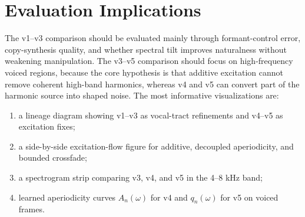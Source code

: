 \documentclass[11pt]{article}
\newcommand{\ap}{A}
\begin{document}
\section{Evaluation Implications}

The v1--v3 comparison should be evaluated mainly through formant-control error,
copy-synthesis quality, and whether spectral tilt improves naturalness without
weakening manipulation. The v3--v5 comparison should focus on high-frequency
voiced regions, because the core hypothesis is that additive excitation cannot
remove coherent high-band harmonics, whereas v4 and v5 can convert part of the
harmonic source into shaped noise. The most informative visualizations are:
\begin{enumerate}
  \item a lineage diagram showing v1--v3 as vocal-tract refinements and v4--v5
        as excitation fixes;
  \item a side-by-side excitation-flow figure for additive, decoupled
        aperiodicity, and bounded crossfade;
  \item a spectrogram strip comparing v3, v4, and v5 in the 4--8 kHz band;
  \item learned aperiodicity curves $\ap_n(\omega)$ for v4 and $q_n(\omega)$
        for v5 on voiced frames.
\end{enumerate}
\end{document}
